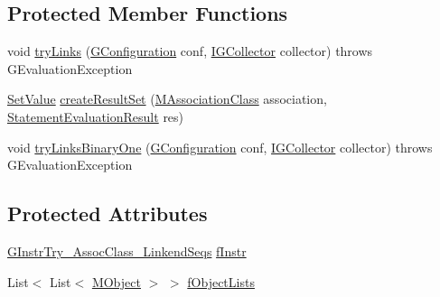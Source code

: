 \subsection*{Protected Member Functions}
\begin{DoxyCompactItemize}
\item 
void \hyperlink{classorg_1_1tzi_1_1use_1_1gen_1_1assl_1_1dynamics_1_1_g_eval_instr_try___assoc_class___linkend_seqs_ab0c9c3b12b7784502ff8c9d89294541c}{try\-Links} (\hyperlink{classorg_1_1tzi_1_1use_1_1gen_1_1assl_1_1dynamics_1_1_g_configuration}{G\-Configuration} conf, \hyperlink{interfaceorg_1_1tzi_1_1use_1_1gen_1_1assl_1_1dynamics_1_1_i_g_collector}{I\-G\-Collector} collector)  throws G\-Evaluation\-Exception 
\item 
\hyperlink{classorg_1_1tzi_1_1use_1_1uml_1_1ocl_1_1value_1_1_set_value}{Set\-Value} \hyperlink{classorg_1_1tzi_1_1use_1_1gen_1_1assl_1_1dynamics_1_1_g_eval_instr_try___assoc_class___linkend_seqs_a1d798fc99d8d7a24e30d9e48726b108b}{create\-Result\-Set} (\hyperlink{interfaceorg_1_1tzi_1_1use_1_1uml_1_1mm_1_1_m_association_class}{M\-Association\-Class} association, \hyperlink{classorg_1_1tzi_1_1use_1_1uml_1_1sys_1_1_statement_evaluation_result}{Statement\-Evaluation\-Result} res)
\item 
void \hyperlink{classorg_1_1tzi_1_1use_1_1gen_1_1assl_1_1dynamics_1_1_g_eval_instr_try___assoc_class___linkend_seqs_a7132b814aa6730ea28acfc3b71419ace}{try\-Links\-Binary\-One} (\hyperlink{classorg_1_1tzi_1_1use_1_1gen_1_1assl_1_1dynamics_1_1_g_configuration}{G\-Configuration} conf, \hyperlink{interfaceorg_1_1tzi_1_1use_1_1gen_1_1assl_1_1dynamics_1_1_i_g_collector}{I\-G\-Collector} collector)  throws G\-Evaluation\-Exception 
\end{DoxyCompactItemize}
\subsection*{Protected Attributes}
\begin{DoxyCompactItemize}
\item 
\hyperlink{classorg_1_1tzi_1_1use_1_1gen_1_1assl_1_1statics_1_1_g_instr_try___assoc_class___linkend_seqs}{G\-Instr\-Try\-\_\-\-Assoc\-Class\-\_\-\-Linkend\-Seqs} \hyperlink{classorg_1_1tzi_1_1use_1_1gen_1_1assl_1_1dynamics_1_1_g_eval_instr_try___assoc_class___linkend_seqs_ae52fee4d0df6e786194536dadcbb5204}{f\-Instr}
\item 
List$<$ List$<$ \hyperlink{interfaceorg_1_1tzi_1_1use_1_1uml_1_1sys_1_1_m_object}{M\-Object} $>$ $>$ \hyperlink{classorg_1_1tzi_1_1use_1_1gen_1_1assl_1_1dynamics_1_1_g_eval_instr_try___assoc_class___linkend_seqs_a908e919b39d75dee978828dc15fc9dfd}{f\-Object\-Lists}
\end{DoxyCompactItemize}


